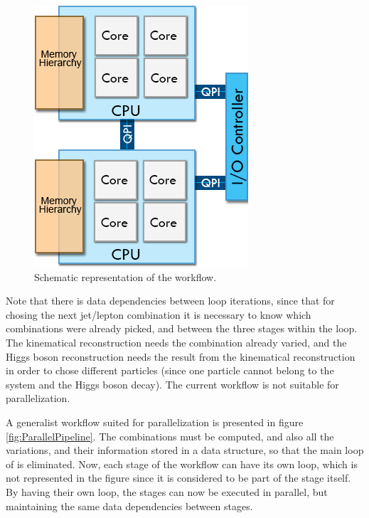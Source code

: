 \begin{figure}[!htp]
	\begin{center}
		\includegraphics[scale=0.5]{../../common/img/numa_qpi.png}
		\caption{Schematic representation of the \ttDilepKinFit workflow.}
		\label{fig:SeqPipeline}
	\end{center}
\end{figure}

Note that there is data dependencies between loop iterations, since that for chosing the next jet/lepton combination it is necessary to know which combinations were already picked, and between the three stages within the loop. The kinematical reconstruction needs the combination already varied, and the Higgs boson reconstruction needs the result from the kinematical reconstruction in order to chose different particles (since one particle cannot belong to the \ttbar system and the Higgs boson decay). The current workflow is not suitable for parallelization.

A generalist workflow suited for parallelization is presented in figure \ref{fig:ParallelPipeline}. The combinations must be computed, and also all the variations, and their information stored in a data structure, so that the main loop of \ttDilepKinFit is eliminated. Now, each stage of the workflow can have its own loop, which is not represented in the figure since it is considered to be part of the stage itself. By having their own loop, the stages can now be executed in parallel, but maintaining the same data dependencies between stages.

